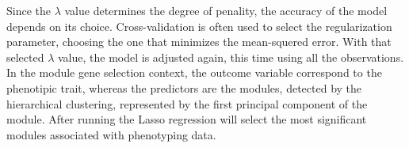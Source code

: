 \documentclass[conference]{IEEEtran}
\begin{document}


Since the $\lambda$ value determines the degree of penality, the accuracy of the model depends on its choice. Cross-validation is often used to select the regularization parameter, choosing the one that minimizes the mean-squered error. With that selected $\lambda$ value, the model is adjusted again, this time using all the observations.\\

In the module gene selection context, the outcome variable correspond to the phenotipic trait, whereas the predictors are the modules, detected by the hierarchical clustering, represented by the first principal component of the module. After running the Lasso regression will select the most significant modules associated with phenotyping data.  
\end{document}
